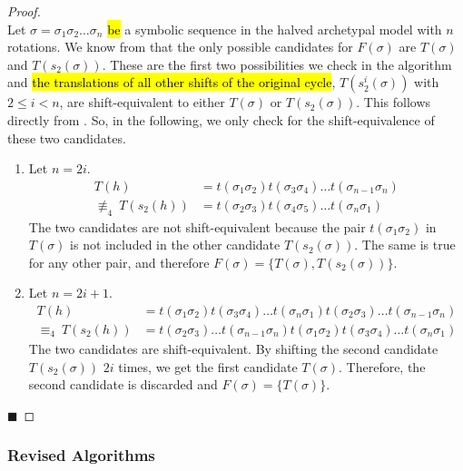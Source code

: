 \begin{proof} \phantom{x} \\
	Let $\sigma = \sigma_1\sigma_2 \dots \sigma_n$ \hl{be} a symbolic sequence in the halved archetypal model with $n$ rotations.
	We know from  that the only possible candidates for $F(\sigma)$ are $T(\sigma)$ and $T(s_2(\sigma))$.
	These are the first two possibilities we check in the algorithm and \hl{the translations of all other shifts of the original cycle}, $T(s_2^i(\sigma))$ with $2 \leq i < n$, are shift-equivalent to either $T(\sigma)$ or $T(s_2(\sigma))$.
	This follows directly from .
	So, in the following, we only check for the shift-equivalence of these two candidates.
	\begin{enumerate}
		\item Let $n = 2i$.
		      \begin{align*}
			      T(h)                   & = t(\sigma_1\sigma_2) t(\sigma_3\sigma_4) \dots t(\sigma_{n-1}\sigma_n) \\
			      \nequiv_4 \: T(s_2(h)) & = t(\sigma_2\sigma_3) t(\sigma_4\sigma_5) \dots t(\sigma_n\sigma_1)
		      \end{align*}
		      The two candidates are not shift-equivalent because the pair $t(\sigma_1\sigma_2)$ in $T(\sigma)$ is not included in the other candidate $T(s_2(\sigma))$.
		      The same is true for any other pair, and therefore $F(\sigma) = \{T(\sigma), T(s_2(\sigma))\}$.
		\item Let $n = 2i + 1$.
		      \begin{align*}
			      T(h)                  & = t(\sigma_1\sigma_2) t(\sigma_3\sigma_4) \dots t(\sigma_n\sigma_1) t(\sigma_2\sigma_3) \dots t(\sigma_{n-1}\sigma_n) \\
			      \equiv_4 \: T(s_2(h)) & = t(\sigma_2\sigma_3) \dots t(\sigma_{n-1}\sigma_n) t(\sigma_1\sigma_2) t(\sigma_3\sigma_4) \dots t(\sigma_n\sigma_1)
		      \end{align*}
		      The two candidates are shift-equivalent.
		      By shifting the second candidate $T(s_2(\sigma))$ $2i$ times, we get the first candidate $T(\sigma)$.
		      Therefore, the second candidate is discarded and $F(\sigma) = \{T(\sigma)\}$.
	\end{enumerate}
	\hfill $\blacksquare$
\end{proof}

\subsubsection{Revised Algorithms}

